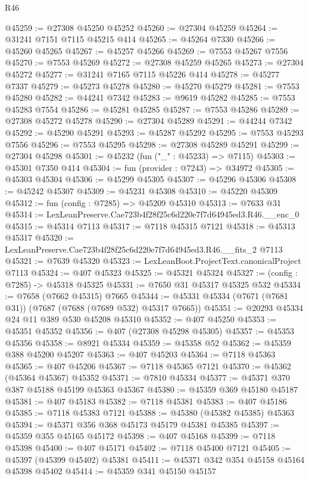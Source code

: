 \begin{lexlean}{R46}
\begin{coremodule}
@45259 := @27308 @45250 @45252
@45260 := @27304 @45259
@45264 := @31241 @7151 @7115 @45215 @414
@45265 := @45264 @7330
@45266 := @45260 @45265
@45267 := @45257 @45266
@45269 := @7553 @45267 @7556
@45270 := @7553 @45269
@45272 := @27308 @45259 @45265
@45273 := @27304 @45272
@45277 := @31241 @7165 @7115 @45226 @414
@45278 := @45277 @7337
@45279 := @45273 @45278
@45280 := @45270 @45279
@45281 := @7553 @45280
@45282 := @44241 @7342
@45283 := @9619 @45282
@45285 := @7553 @45283 @7554
@45286 := @45281 @45285
@45287 := @7553 @45286
@45289 := @27308 @45272 @45278
@45290 := @27304 @45289
@45291 := @44244 @7342
@45292 := @45290 @45291
@45293 := @45287 @45292
@45295 := @7553 @45293 @7556
@45296 := @7553 @45295
@45298 := @27308 @45289 @45291
@45299 := @27304 @45298
@45301 := @45232 (fun ("_" : @45233) => @7115)
@45303 := @45301 @7350 @414
@45304 := fun (provider : @7243) => @34972
@45305 := @45303 @45304
@45306 := @45299 @45305
@45307 := @45296 @45306
@45308 := @45242 @45307
@45309 := @45231 @45308
@45310 := @45220 @45309
@45312 := fun (config : @7285) => @45209 @45310
@45313 := @7633 @31
@45314 := LexLeanPreserve.Cae723b4f28f25c6d220e7f7d64945ed3.R46.__enc_0
@45315 := @45314 @7113
@45317 := @7118 @45315 @7121
@45318 := @45313 @45317
@45320 := LexLeanPreserve.Cae723b4f28f25c6d220e7f7d64945ed3.R46.__fits_2 @7113
@45321 := @7639 @45320
@45323 := LexLeanBoot.ProjectText.canonicalProject @7113
@45324 := @407 @45323
@45325 := @45321 @45324
@45327 := (config : @7285) -> @45318 @45325
@45331 := @7650 @31 @45317 @45325 @532
@45334 := @7658 (@7662 @45315) @7665
@45344 := @45331 @45334 (@7671 (@7681 @31)) (@7687 (@7688 (@7689 @532) @45317 @7665))
@45351 := @20293 @45334 @24 @11 @389 @530 @45208 @45310
@45352 := @407 @45250
@45353 := @45351 @45352
@45356 := @407 (@27308 @45298 @45305)
@45357 := @45353 @45356
@45358 := @8921 @45334
@45359 := @45358 @52
@45362 := @45359 @388 @45200 @45207
@45363 := @407 @45203
@45364 := @7118 @45363
@45365 := @407 @45206
@45367 := @7118 @45365 @7121
@45370 := @45362 (@45364 @45367) @45352
@45371 := @7810 @45334
@45377 := @45371 @370 @387 @45188 @45199 @45363 @45367
@45380 := @45359 @369 @45180 @45187
@45381 := @407 @45183
@45382 := @7118 @45381
@45383 := @407 @45186
@45385 := @7118 @45383 @7121
@45388 := @45380 (@45382 @45385) @45363
@45394 := @45371 @356 @368 @45173 @45179 @45381 @45385
@45397 := @45359 @355 @45165 @45172
@45398 := @407 @45168
@45399 := @7118 @45398
@45400 := @407 @45171
@45402 := @7118 @45400 @7121
@45405 := @45397 (@45399 @45402) @45381
@45411 := @45371 @342 @354 @45158 @45164 @45398 @45402
@45414 := @45359 @341 @45150 @45157

\end{coremodule}
\end{lexlean}
